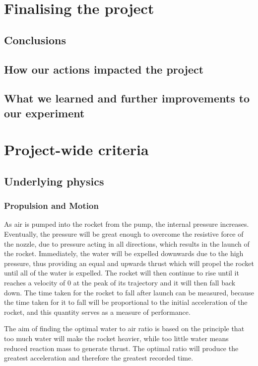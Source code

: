 \documentclass[14pt]{article}
\begin{document}
\section{Finalising the project}
\subsection{Conclusions}
\subsection{How our actions impacted the project}
\subsection{What we learned and further improvements to our experiment}
\section{Project-wide criteria}
\subsection{Underlying physics}
\subsubsection{Propulsion and Motion}
As air is pumped into the rocket from the pump, the internal pressure increases. Eventually, the pressure will be great enough to overcome the resistive force of the nozzle, due to pressure acting in all directions, which results in the launch of the rocket. Immediately, the water will be expelled downwards due to the high pressure, thus providing an equal and upwards thrust which will propel the rocket until all of the water is expelled. The rocket will then continue to rise until it reaches a velocity of 0 at the peak of its trajectory and it will then fall back down. The time taken for the rocket to fall after launch can be measured, because the time taken for it to fall will be proportional to the initial acceleration of the rocket, and this quantity serves as a measure of performance. 

The aim of finding the optimal water to air ratio is based on the principle that too much water will make the rocket heavier, while too little water means reduced reaction mass to generate thrust. The optimal ratio will produce the greatest acceleration and therefore the greatest recorded time. 
\end{document}
